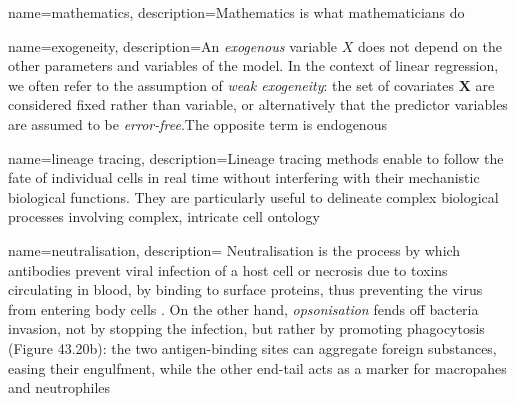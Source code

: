 {name=mathematics, 
description={Mathematics is what mathematicians do}}

{name=exogeneity, 
description={An \textit{exogenous} variable $X$ does not depend on the other parameters and variables of the model. In the context of linear regression, we often refer to the assumption of \textit{weak exogeneity}: the set of covariates $\boldsymbol{X}$ are considered fixed rather than variable, or alternatively that the predictor variables are assumed to be \textit{error-free}.The opposite term is endogenous}}

{name=lineage tracing, 
description={Lineage tracing methods enable to follow the fate of individual cells in real time without interfering with their mechanistic biological functions. They are particularly useful to delineate complex biological processes involving complex, intricate cell ontology}}

{name=neutralisation, 
description={
Neutralisation is the process by which antibodies prevent viral infection
of a host cell or necrosis due to toxins circulating in blood, by binding to surface proteins, thus preventing the virus from entering body cells \autocite[Figure 20a, Chapter 43]{campbell_etal20}.
On the other hand, \textit{opsonisation} fends off bacteria invasion, not by stopping the infection, but rather by promoting phagocytosis (Figure 43.20b): the two antigen-binding sites can aggregate foreign substances, easing their engulfment, while the other end-tail acts as a marker for macropahes and neutrophiles \autocite[Figure 20b, Chapter 43]{campbell_etal20}
}}

